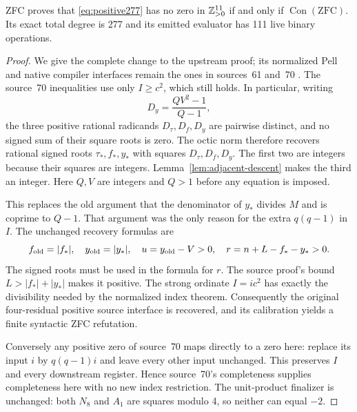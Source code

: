 \begin{prop}
ZFC proves that \eqref{eq:positive277} has no zero in $\mathbb Z_{>0}^{11}$ if and
only if $\operatorname{Con}(\mathrm{ZFC})$. Its exact total degree is 277
and its emitted evaluator has 111 live binary operations.
\end{prop}
\begin{proof}
We give the complete change to the upstream proof; its normalized Pell
and native compiler interfaces remain the ones in sources~61 and~70
\cite{source61,source70}. The source~70 inequalities use only $I\ge c^2$,
which still holds. In particular, writing
\[
 D_y=\frac{QV^2-1}{Q-1},
\]
the three positive rational radicands $D_\tau,D_f,D_y$ are pairwise
distinct, and no signed sum of their square roots is zero. The octic norm
therefore recovers rational signed roots $\tau_*,f_*,y_*$ with squares
$D_\tau,D_f,D_y$. The first two are integers because their squares are
integers. Lemma~\ref{lem:adjacent-descent} makes the third an integer.
Here $Q,V$ are integers and $Q>1$ before any equation is imposed.

This replaces the old argument that the denominator of $y_*$ divides $M$
and is coprime to $Q-1$. That argument was the only reason for the extra
$q(q-1)$ in $I$. The unchanged recovery formulas are
\[
 f_{\rm old}=|f_*|,\quad y_{\rm old}=|y_*|,\quad
 u=y_{\rm old}-V>0,\quad r=n+L-f_*-y_*>0.
\]
The signed roots must be used in the formula for $r$. The source proof's
bound $L>|f_*|+|y_*|$ makes it positive. The strong ordinate $I=ic^2$
has exactly the divisibility needed by the normalized index theorem.
Consequently the original four-residual positive source interface is
recovered, and its calibration yields a finite syntactic ZFC refutation.

Conversely any positive zero of source~70 maps directly to a zero here:
replace its input $i$ by $q(q-1)i$ and leave every other input unchanged.
This preserves $I$ and every downstream register. Hence source~70's
completeness supplies completeness here with no new index restriction.
The unit-product finalizer is unchanged: both $N_8$ and $A_1$ are squares
modulo 4, so neither can equal $-2$.


\end{proof}
